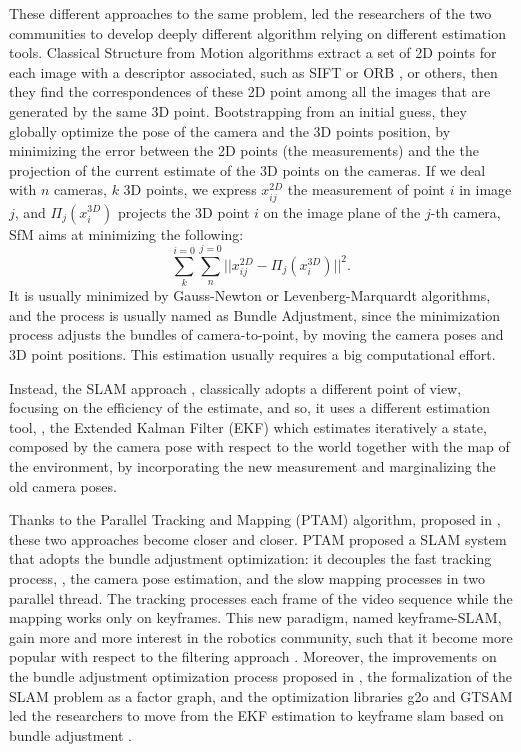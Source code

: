 These different approaches to the same problem, led the researchers of the two communities to develop deeply different algorithm relying on different estimation tools.
Classical Structure from Motion algorithms \cite{triggs2000bundle,sibley2009adaptive,wu2011multicore} extract a set of 2D points for each image with a descriptor associated, such as SIFT \cite{sift} or ORB \cite{orb}, or others, then they find the correspondences of these 2D point among all the images that are generated by the same 3D point. Bootstrapping from an initial guess, they globally optimize the pose of the camera and the 3D points position, by minimizing the error between the 2D points (the measurements) and the the projection of the current estimate of the 3D points on the cameras.
If we deal with $n$ cameras, $k$ 3D points, we express $x_{ij}^{2D}$ the measurement of point $i$ in image $j$, and $\Pi_j(x_i^{3D})$ projects the 3D point $i$ on the image plane of the $j$-th camera, SfM aims at minimizing the following:
\[
\sum_{k}^{i=0}\sum_{n}^{j=0}||x_{ij}^{2D} - \Pi_j(x_i^{3D})||^2.
\]
It is usually minimized by Gauss-Newton or Levenberg-Marquardt algorithms, and the process is usually named as Bundle Adjustment, since the minimization process adjusts the bundles of camera-to-point, by moving the camera poses and 3D point positions. This estimation usually requires a big computational effort.


Instead, the SLAM approach \cite{davison2007monoslam,ceriani2014single,grasa2011ekf}, classically adopts a different point of view, focusing on the efficiency of the estimate, and so, it uses a different estimation tool, \ie, the Extended Kalman Filter (EKF) which estimates iteratively a state, composed by the camera pose with respect to the world together with the map of the environment, by incorporating the new measurement and marginalizing the old camera poses.  


Thanks to the Parallel Tracking and Mapping (PTAM) algorithm, proposed in \cite{klein_murray07}, these two approaches become closer and closer. PTAM proposed a SLAM system that adopts the bundle adjustment optimization: it decouples the fast tracking process, \ie, the camera pose estimation, and the slow mapping processes in two parallel thread.  
The tracking processes each frame of the video sequence while the mapping works only on keyframes. 
This new paradigm, named keyframe-SLAM, gain more and more interest in the robotics community, such that it become more popular with respect to the filtering approach \cite{strasdat2010real}.
Moreover, the improvements on the bundle adjustment optimization process proposed in \cite{kaess2008isam},  the formalization of the SLAM problem as a factor graph\cite{thrun2006graph}, and the optimization libraries g2o \cite{kummerle2011g} and GTSAM \cite{dellaert2012factor} led the researchers to move from the EKF estimation to keyframe slam based on bundle adjustment \cite{strasdat11,sunderhauf2012towards,johannsson2013temporally}. 

